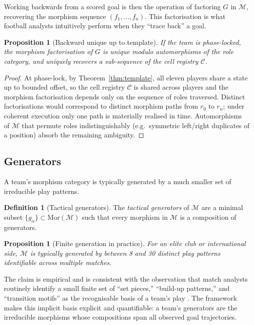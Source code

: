 \documentclass[11pt,twocolumn,a4paper]{article}
\newtheorem{proposition}[theorem]{Proposition}
\theoremstyle{definition}
\newtheorem{definition}[theorem]{Definition}
\theoremstyle{remark}
\newcommand{\Ccal}{\mathcal{C}}
\newcommand{\Mcal}{\mathcal{M}}
\begin{document}
Working backwards from a scored goal is then the operation of factoring
$G$ in $\Mcal$, recovering the morphism sequence $(f_1, \ldots, f_n)$.
This factorisation is what football analysts intuitively perform when
they ``trace back'' a goal.

\begin{proposition}[Backward unique up to template]
\label{prop:backward}
If the team is phase-locked, the morphism factorisation of $G$ is
unique modulo automorphisms of the role category, and uniquely
recovers a sub-sequence of the cell registry $\Ccal$.
\end{proposition}

\begin{proof}
At phase-lock, by Theorem~\ref{thm:template}, all eleven players share
a state up to bounded offset, so the cell registry $\Ccal$ is shared
across players and the morphism factorisation depends only on the
sequence of roles traversed. Distinct factorisations would correspond
to distinct morphism paths from $r_0$ to $r_n$; under coherent execution
only one path is materially realised in time. Automorphisms of $\Mcal$
that permute roles indistinguishably (e.g.\ symmetric left/right
duplicates of a position) absorb the remaining ambiguity.
\end{proof}

\subsection{Generators}

A team's morphism category is typically generated by a much smaller set
of irreducible play patterns.

\begin{definition}[Tactical generators]
\label{def:gen}
The \emph{tactical generators} of $\Mcal$ are a minimal subset
$\{g_\alpha\} \subset \mathrm{Mor}(\Mcal)$ such that every morphism in
$\Mcal$ is a composition of generators.
\end{definition}

\begin{proposition}[Finite generation in practice]
\label{prop:fingen}
For an elite club or international side, $\Mcal$ is typically generated
by between 8 and 30 distinct play patterns identifiable across multiple
matches.
\end{proposition}

The claim is empirical and is consistent with the observation that
match analysts routinely identify a small finite set of ``set pieces,''
``build-up patterns,'' and ``transition motifs'' as the recognisable
basis of a team's play \citep{hughes2005,memmert2017}. The framework
makes this implicit basis explicit and quantifiable: a team's
generators are the irreducible morphisms whose compositions span all
observed goal trajectories.
\end{document}

